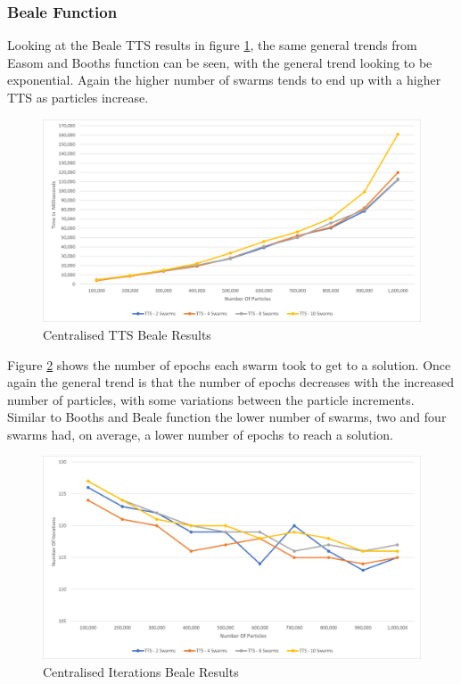 \documentclass[oneside,12pt]{book}
\begin{document}
\subsubsection{Beale Function}

Looking at the Beale TTS results in figure \ref{fig:Centralised_TTS_Beale_Results}, the same general trends from Easom and Booths function can be seen, with the general trend looking to be exponential. Again the higher number of swarms tends to end up with a higher TTS as particles increase. 

\begin{figure}[H]
    \centering
    \includegraphics[scale=0.45]{Images/Graphs/CentralisedBealeTTS.png}
    \caption{Centralised TTS Beale Results}
    \label{fig:Centralised_TTS_Beale_Results}
\end{figure}

Figure \ref{fig:Centralised_Epoc_Beale_Results} shows the number of epochs each swarm took to get to a solution. Once again the general trend is that the number of epochs decreases with the increased number of particles, with some variations between the particle increments. Similar to Booths and Beale function the lower number of swarms, two and four swarms had, on average, a lower number of epochs to reach a solution.  

\begin{figure}[H]
    \centering
    \includegraphics[scale=0.45]{Images/Graphs/CentralisedBealeEpoch.png}
    \caption{Centralised Iterations Beale Results}
    \label{fig:Centralised_Epoc_Beale_Results}
\end{figure}
\end{document}
